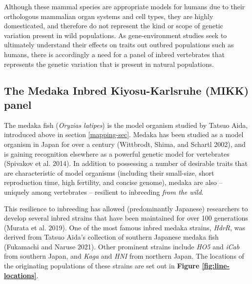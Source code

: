 \documentclass[
]{book}
\begin{document}
Although these mammal species are appropriate models for humans due to their orthologous mammalian organ systems and cell types, they are highly domesticated, and therefore do not represent the kind or scope of genetic variation present in wild populations. As gene-environment studies seek to ultimately understand their effects on traits out outbred populations such as humans, there is accordingly a need for a panel of inbred vertebrates that represents the genetic variation that is present in natural populations.

\hypertarget{MIKK-background}{%
\subsection{The Medaka Inbred Kiyosu-Karlsruhe (MIKK) panel}\label{MIKK-background}}

The medaka fish (\emph{Oryzias latipes}) is the model organism studied by Tatsuo Aida, introduced above in section \ref{mapping-sec}. Medaka has been studied as a model organism in Japan for over a century (Wittbrodt, Shima, and Schartl 2002), and is gaining recognition elsewhere as a powerful genetic model for vertebrates (Spivakov et al. 2014). In addition to possessing a number of desirable traits that are characteristic of model organisms (including their small-size, short reproduction time, high fertility, and concise genome), medaka are also -- uniquely among vertebrates -- resilient to inbreeding \emph{from the wild}.

This resilience to inbreeding has allowed (predominantly Japanese) researchers to develop several inbred strains that have been maintained for over 100 generations (Murata et al. 2019). One of the most famous inbred medaka strains, \emph{HdrR}, was derived from Tatsuo Aida's collection of southern Japanese medaka fish (Fukamachi and Naruse 2021). Other prominent strains include \emph{HO5} and \emph{iCab} from southern Japan, and \emph{Kaga} and \emph{HNI} from northern Japan. The locations of the originating populations of these strains are set out in \textbf{Figure \ref{fig:line-locations}}.
\end{document}
